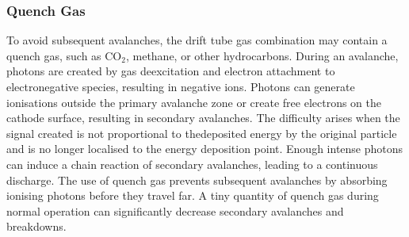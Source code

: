 \subsubsection{Quench Gas}
To avoid subsequent avalanches, the drift tube gas combination may contain a quench gas, such as CO$_2$, 
methane, or other hydrocarbons. During an avalanche, photons are created by gas deexcitation and electron 
attachment to electronegative species, resulting in negative ions. Photons can generate ionisations 
outside the primary avalanche zone or create free electrons on the cathode surface, resulting in secondary avalanches.
The difficulty arises when the signal created is not proportional to thedeposited energy by the original particle 
and is no longer localised to the energy deposition point. Enough intense photons can induce a chain reaction of 
secondary avalanches, leading to a continuous discharge. The use of quench gas prevents subsequent 
avalanches by absorbing ionising photons before they travel far. A tiny quantity of quench gas during normal operation 
can significantly decrease secondary avalanches and breakdowns.
